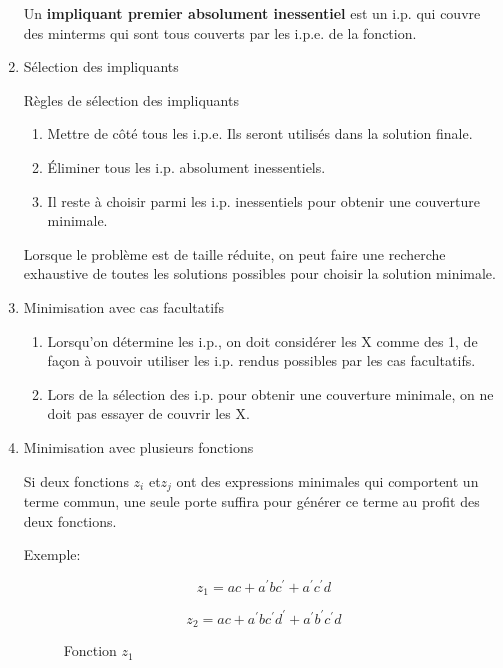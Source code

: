 \documentclass[letter, oneside]{book}
\begin{document}
\begin{enumerate}
Un \textbf{impliquant premier absolument inessentiel} est un i.p. qui couvre
des minterms qui sont tous couverts par les i.p.e. de la fonction.

\item Sélection des impliquants
\label{sec:org61c05ec}

Règles de sélection des impliquants

\begin{enumerate}
\item Mettre de côté tous les i.p.e. Ils seront utilisés dans la solution
finale.

\item Éliminer tous les i.p. absolument inessentiels.

\item Il reste à choisir parmi les i.p. inessentiels pour obtenir une
couverture minimale.
\end{enumerate}

Lorsque le problème est de taille réduite, on peut faire une recherche
exhaustive de toutes les solutions possibles pour choisir la solution
minimale.

\item Minimisation avec cas facultatifs
\label{sec:orgc74a76a}

\begin{enumerate}
\item Lorsqu'on détermine les i.p., on doit considérer les X comme des
1, de façon à pouvoir utiliser les i.p. rendus possibles par les
cas facultatifs.

\item Lors de la sélection des i.p. pour obtenir une couverture
minimale, on ne doit pas essayer de couvrir les X.
\end{enumerate}

\item Minimisation avec plusieurs fonctions
\label{sec:org050617b}

Si deux fonctions \(z_i\) et\(z_j\) ont des expressions minimales qui
comportent un terme commun, une seule porte suffira pour générer ce
terme au profit des deux fonctions.

Exemple:

$$z_1 = a c + a^{\prime} b c^{\prime} + a^{\prime} c^{\prime} d$$

$$z_2 = a c + a^{\prime}  b c^{\prime} d^{\prime} +
a^{\prime} b^{\prime} c^{\prime} d$$

\begin{figure}[htbp]
\centering

\caption{\label{fig:orgaec0c7d}Fonction \(z_1\)}
\end{figure}


\end{enumerate}
\end{document}
